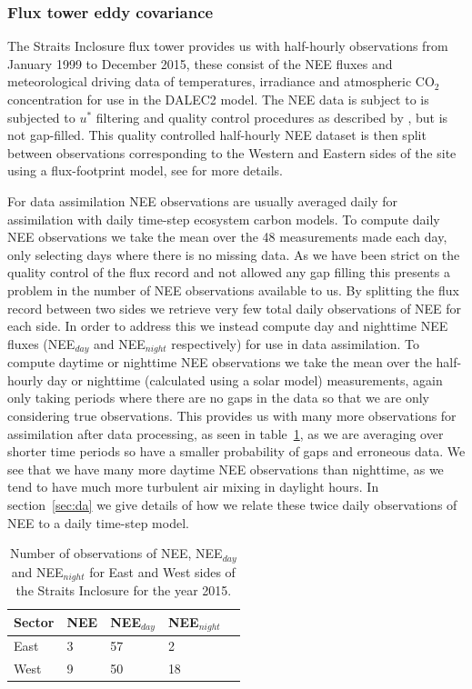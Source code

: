 \documentclass[11pt]{article}
\begin{document}
\subsubsection{Flux tower eddy covariance} \label{sec:eddycov} 

The Straits Inclosure flux tower provides us with half-hourly observations from January 1999 to December 2015, these consist of the NEE fluxes and meteorological driving data of temperatures, irradiance and atmospheric CO\(_{2}\) concentration for use in the DALEC2 model. The NEE data is subject to is subjected to \(u^*\) filtering and quality control procedures as described by \citet{papale2006towards}, but is not gap-filled. This quality controlled half-hourly NEE dataset is then split between observations corresponding to the Western and Eastern sides of the site using a flux-footprint model, see \citet{wilkinson2015effects} for more details.  

For data assimilation NEE observations are usually averaged daily for assimilation with daily time-step ecosystem carbon models. To compute daily NEE observations we take the mean over the 48 measurements made each day, only selecting days where there is no missing data. As we have been strict on the quality control of the flux record and not allowed any gap filling this presents a problem in the number of NEE observations available to us. By splitting the flux record between two sides we retrieve very few total daily observations of NEE for each side. In order to address this we instead compute day and nighttime NEE fluxes (NEE\(_{day}\) and NEE\(_{night}\) respectively) for use in data assimilation. To compute daytime or nighttime NEE observations we take the mean over the half-hourly day or nighttime (calculated using a solar model) measurements, again only taking periods where there are no gaps in the data so that we are only considering true observations. This provides us with many more observations for assimilation after data processing, as seen in table~\ref{table:nee_obs}, as we are averaging over shorter time periods so have a smaller probability of gaps and erroneous data. We see that we have many more daytime NEE observations than nighttime, as we tend to have much more turbulent air mixing in daylight hours. In section~\ref{sec:da} we give details of how we relate these twice daily observations of NEE to a daily time-step model.     

\begin{table}[ht] 
\begin{center}
	\begin{tabular}{| l | l | l | l | l |}
	\hline
	Sector & NEE & NEE\(_{day}\) & NEE\(_{night}\)  \\ \hline
	East & 3 & 57 & 2 \\ \hline
	West & 9 & 50 & 18 \\ \hline
	\end{tabular}
	\caption{Number of observations of NEE, NEE\(_{day}\) and NEE\(_{night}\) for East and West sides of the Straits Inclosure for the year 2015.}
	\label{table:nee_obs}
\end{center} 
\end{table}
\end{document}
